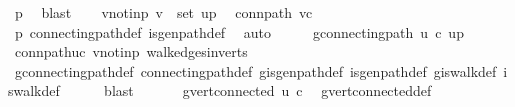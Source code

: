 \begin{isabellebody}
\ p\ \isamarkupfalse%
\ blast\isanewline
\ \ \isamarkupfalse%
\ v{\isacharunderscore}{\kern0pt}notin{\isacharunderscore}{\kern0pt}p{\isacharprime}{\kern0pt}{\isacharcolon}{\kern0pt}\ {\isachardoublequoteopen}v\ {\isasymnotin}\ set\ {\isacharparenleft}{\kern0pt}u{\isacharhash}{\kern0pt}p{\isacharprime}{\kern0pt}{\isacharparenright}{\kern0pt}{\isachardoublequoteclose}\ \isamarkupfalse%
\ conn{\isacharunderscore}{\kern0pt}path\ {\isacartoucheopen}v{\isasymnoteq}c{\isacartoucheclose}\ \isamarkupfalse%
\ p\ connecting{\isacharunderscore}{\kern0pt}path{\isacharunderscore}{\kern0pt}def\ is{\isacharunderscore}{\kern0pt}gen{\isacharunderscore}{\kern0pt}path{\isacharunderscore}{\kern0pt}def\ \isamarkupfalse%
\ auto\isanewline
\ \ \isamarkupfalse%
\ \isamarkupfalse%
\ {\isachardoublequoteopen}g{\isacharprime}{\kern0pt}{\isachardot}{\kern0pt}connecting{\isacharunderscore}{\kern0pt}path\ u\ c\ {\isacharparenleft}{\kern0pt}u{\isacharhash}{\kern0pt}p{\isacharprime}{\kern0pt}{\isacharparenright}{\kern0pt}{\isachardoublequoteclose}\ \isamarkupfalse%
\ conn{\isacharunderscore}{\kern0pt}path{\isacharunderscore}{\kern0pt}uc\ v{\isacharunderscore}{\kern0pt}notin{\isacharunderscore}{\kern0pt}p{\isacharprime}{\kern0pt}\ walk{\isacharunderscore}{\kern0pt}edges{\isacharunderscore}{\kern0pt}in{\isacharunderscore}{\kern0pt}verts\isanewline
\ \ \ \ \isamarkupfalse%
\ g{\isacharprime}{\kern0pt}{\isachardot}{\kern0pt}connecting{\isacharunderscore}{\kern0pt}path{\isacharunderscore}{\kern0pt}def\ connecting{\isacharunderscore}{\kern0pt}path{\isacharunderscore}{\kern0pt}def\ g{\isacharprime}{\kern0pt}{\isachardot}{\kern0pt}is{\isacharunderscore}{\kern0pt}gen{\isacharunderscore}{\kern0pt}path{\isacharunderscore}{\kern0pt}def\ is{\isacharunderscore}{\kern0pt}gen{\isacharunderscore}{\kern0pt}path{\isacharunderscore}{\kern0pt}def\ g{\isacharprime}{\kern0pt}{\isachardot}{\kern0pt}is{\isacharunderscore}{\kern0pt}walk{\isacharunderscore}{\kern0pt}def\ is{\isacharunderscore}{\kern0pt}walk{\isacharunderscore}{\kern0pt}def\isanewline
\ \ \ \ \isamarkupfalse%
\ blast\ \isanewline
\ \ \isamarkupfalse%
\ \isamarkupfalse%
\ {\isachardoublequoteopen}g{\isacharprime}{\kern0pt}{\isachardot}{\kern0pt}vert{\isacharunderscore}{\kern0pt}connected\ u\ c{\isachardoublequoteclose}\ \isamarkupfalse%
\ g{\isacharprime}{\kern0pt}{\isachardot}{\kern0pt}vert{\isacharunderscore}{\kern0pt}connected{\isacharunderscore}{\kern0pt}def\ \isamarkupfalse%

\end{isabellebody}
